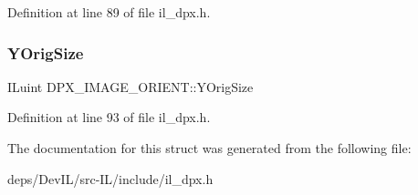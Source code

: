 Definition at line 89 of file il\+\_\+dpx.\+h.

\mbox{\label{structDPX__IMAGE__ORIENT_aa5389477d8828e16fb5ea82a6d6acf32}} 
\subsubsection{\texorpdfstring{Y\+Orig\+Size}{YOrigSize}}
{\footnotesize\ttfamily I\+Luint D\+P\+X\+\_\+\+I\+M\+A\+G\+E\+\_\+\+O\+R\+I\+E\+N\+T\+::\+Y\+Orig\+Size}



Definition at line 93 of file il\+\_\+dpx.\+h.



The documentation for this struct was generated from the following file\+:\begin{DoxyCompactItemize}
\item 
deps/\+Dev\+I\+L/src-\/\+I\+L/include/il\+\_\+dpx.\+h\end{DoxyCompactItemize}
